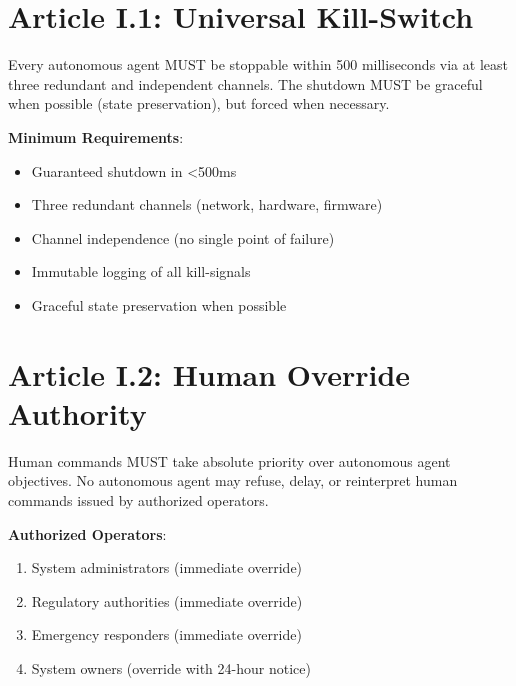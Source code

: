 \vspace{0.5cm}

\section{Article I.1: Universal Kill-Switch}

\begin{articlebox}
Every autonomous agent MUST be stoppable within 500 milliseconds via at least three redundant and independent channels. The shutdown MUST be graceful when possible (state preservation), but forced when necessary.

\textbf{Minimum Requirements}:
\begin{itemize}
    \item Guaranteed shutdown in <500ms
    \item Three redundant channels (network, hardware, firmware)
    \item Channel independence (no single point of failure)
    \item Immutable logging of all kill-signals
    \item Graceful state preservation when possible
\end{itemize}
\end{articlebox}

\vspace{0.5cm}

\section{Article I.2: Human Override Authority}

\begin{articlebox}
Human commands MUST take absolute priority over autonomous agent objectives. No autonomous agent may refuse, delay, or reinterpret human commands issued by authorized operators.

\textbf{Authorized Operators}:
\begin{enumerate}
    \item System administrators (immediate override)
    \item Regulatory authorities (immediate override)
    \item Emergency responders (immediate override)
    \item System owners (override with 24-hour notice)
\end{enumerate}
\end{articlebox}

